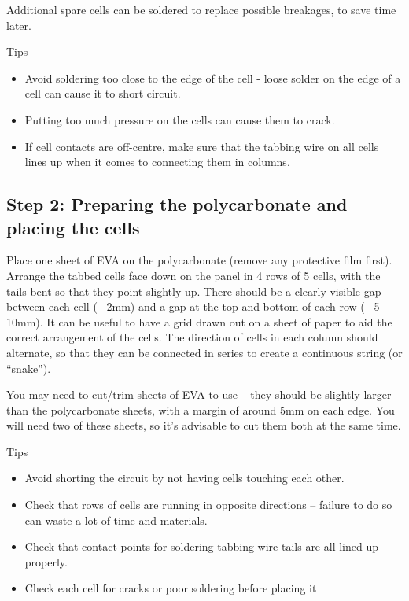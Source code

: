 \documentclass{article}
\theoremstyle{definition}
\theoremstyle{definition}
\theoremstyle{remark}
\begin{document}
    Additional spare cells can be soldered to replace possible breakages, to save time later.

    Tips

    \begin{itemize}
      \item Avoid soldering too close to the edge of the cell - loose solder on the edge of a cell can cause it to short circuit. 
      \item Putting too much pressure on the cells can cause them to crack. 
      \item If cell contacts are off-centre, make sure that the tabbing wire on all cells lines up when it comes to connecting them in columns.
    \end{itemize}
  

  {\color{blue}\subsection{Step 2: Preparing the polycarbonate and placing the cells}} %
  \label{sub:step_2_preparing_the_polycarbonate_and_placing_the_cells}

    Place one sheet of EVA on the polycarbonate (remove any protective film first). Arrange the tabbed cells face down on the panel in 4 rows of 5 cells, with the tails bent so that they point slightly up. There should be a clearly visible gap between each cell (~ 2mm) and a gap at the top and bottom of each row (~ 5-10mm). It can be useful to have a grid drawn out on a sheet of paper to aid the correct arrangement of the cells. The direction of cells in each column should alternate, so that they can be connected in series to create a continuous string (or “snake”). 

    You may need to cut/trim sheets of EVA to use – they should be slightly larger than the polycarbonate sheets, with a margin of around 5mm on each edge. You will need two of these sheets, so it’s advisable to cut them both at the same time.

    Tips

    \begin{itemize}
      \item Avoid shorting the circuit by not having cells touching each other.
      \item Check that rows of cells are running in opposite directions – failure to do so can waste a lot of time and materials.
      \item Check that contact points for soldering tabbing wire tails are all lined up properly.
      \item Check each cell for cracks or poor soldering before placing it
    \end{itemize}
  
\end{document}
